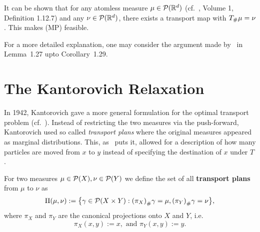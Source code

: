
\begin{remark}\label{TransMapExist}
	It can be shown that for any atomless measure $\mu \in \PM{\R^d}$ (cf.\ \cite{Bog2007}, Volume 1, Definition 1.12.7) and any $\nu \in \PM{\R^d}$, there exists a transport map  with $\push{\mu} = \nu$. This makes (MP) feasible.

	For a more detailed explanation, one may consider the argument made by~\cite{San2015} in Lemma~1.27 upto Corollary~1.29.
\end{remark}

\section{The Kantorovich Relaxation}\label{KantRelax}
In 1942, Kantorovich gave a more general formulation for the optimal transport problem (cf.~\cite{Kan1942}). Instead of restricting the two measures via the push-forward, Kantorovich used so called \textit{transport plans} where the original measures appeared as marginal distributions. This, as~\cite{San2015} puts it,  allowed for a description of how many particles are moved from $x$ to $y$ instead of specifying the destination of $x$ under $T$.

\begin{definition}\label{TransPlans}
	For two measures $\mu \in \PM{X}, \nu \in \PM{Y}$ we define the set of all \textbf{transport plans} from $\mu$ to $\nu$ as
	\[ \TP{\mu}{\nu} := \big\{ \gamma \in \PM{X \times Y} : \push[(\pi_X)]{\gamma} = \mu, \push[(\pi_Y)]{\gamma} = \nu \big\}, \]
	where $\pi_X$ and $\pi_Y$ are the canonical projections onto $X$ and $Y$, i.e.
	\[ \pi_X(x, y) := x, \text{ and } \pi_Y(x, y) := y. \]
\end{definition}

